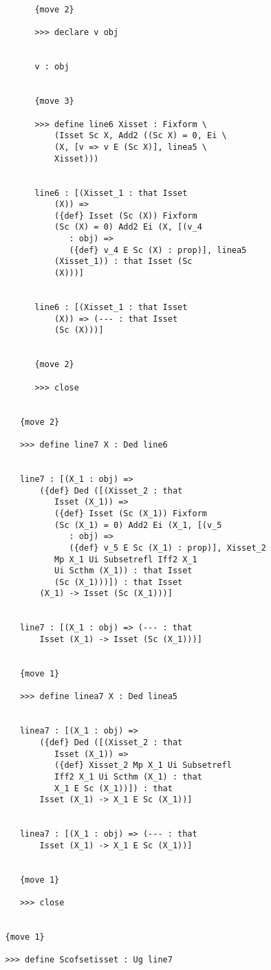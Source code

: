\documentclass[12pt]{article}
\begin{document}
\begin{verbatim}
         {move 2}

         >>> declare v obj


         v : obj


         {move 3}

         >>> define line6 Xisset : Fixform \
             (Isset Sc X, Add2 ((Sc X) = 0, Ei \
             (X, [v => v E (Sc X)], linea5 \
             Xisset)))


         line6 : [(Xisset_1 : that Isset 
             (X)) => 
             ({def} Isset (Sc (X)) Fixform 
             (Sc (X) = 0) Add2 Ei (X, [(v_4 
                : obj) => 
                ({def} v_4 E Sc (X) : prop)], linea5 
             (Xisset_1)) : that Isset (Sc 
             (X)))]


         line6 : [(Xisset_1 : that Isset 
             (X)) => (--- : that Isset 
             (Sc (X)))]


         {move 2}

         >>> close


      {move 2}

      >>> define line7 X : Ded line6


      line7 : [(X_1 : obj) => 
          ({def} Ded ([(Xisset_2 : that 
             Isset (X_1)) => 
             ({def} Isset (Sc (X_1)) Fixform 
             (Sc (X_1) = 0) Add2 Ei (X_1, [(v_5 
                : obj) => 
                ({def} v_5 E Sc (X_1) : prop)], Xisset_2 
             Mp X_1 Ui Subsetrefl Iff2 X_1 
             Ui Scthm (X_1)) : that Isset 
             (Sc (X_1)))]) : that Isset 
          (X_1) -> Isset (Sc (X_1)))]


      line7 : [(X_1 : obj) => (--- : that 
          Isset (X_1) -> Isset (Sc (X_1)))]


      {move 1}

      >>> define linea7 X : Ded linea5


      linea7 : [(X_1 : obj) => 
          ({def} Ded ([(Xisset_2 : that 
             Isset (X_1)) => 
             ({def} Xisset_2 Mp X_1 Ui Subsetrefl 
             Iff2 X_1 Ui Scthm (X_1) : that 
             X_1 E Sc (X_1))]) : that 
          Isset (X_1) -> X_1 E Sc (X_1))]


      linea7 : [(X_1 : obj) => (--- : that 
          Isset (X_1) -> X_1 E Sc (X_1))]


      {move 1}

      >>> close


   {move 1}

   >>> define Scofsetisset : Ug line7



\end{verbatim}
\end{document}
